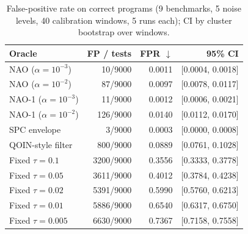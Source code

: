\begin{table}[t]
\centering
\caption{False-positive rate on correct programs (9 benchmarks, 5 noise levels, 40 calibration windows, 5 runs each); CI by cluster bootstrap over windows.}
\label{tab:rq1-soundness}
\small
\begin{tabular}{lrrr}
\toprule
Oracle & FP / tests & FPR $\downarrow$ & 95\% CI \\
\midrule
NAO ($\alpha=10^{-3}$) & 10/9000 & 0.0011 & [0.0004, 0.0018] \\
NAO ($\alpha=10^{-2}$) & 87/9000 & 0.0097 & [0.0078, 0.0117] \\
NAO-1 ($\alpha=10^{-3}$) & 11/9000 & 0.0012 & [0.0006, 0.0021] \\
NAO-1 ($\alpha=10^{-2}$) & 126/9000 & 0.0140 & [0.0112, 0.0170] \\
SPC envelope & 3/9000 & 0.0003 & [0.0000, 0.0008] \\
QOIN-style filter & 800/9000 & 0.0889 & [0.0761, 0.1028] \\
Fixed $\tau=0.1$ & 3200/9000 & 0.3556 & [0.3333, 0.3778] \\
Fixed $\tau=0.05$ & 3611/9000 & 0.4012 & [0.3784, 0.4238] \\
Fixed $\tau=0.02$ & 5391/9000 & 0.5990 & [0.5760, 0.6213] \\
Fixed $\tau=0.01$ & 5886/9000 & 0.6540 & [0.6317, 0.6750] \\
Fixed $\tau=0.005$ & 6630/9000 & 0.7367 & [0.7158, 0.7558] \\
\bottomrule
\end{tabular}
\end{table}
